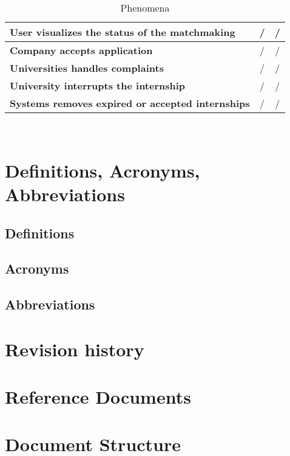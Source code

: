\begin{table}[H]
\begin{tabular}{|p{22em} | c | c |}
    \hline
    \textbf{User visualizes the status of the matchmaking} & /  & /\B\\
    \hline
    \textbf{Company accepts application} & / & /\B\\
    \hline
    \textbf{Universities handles complaints} & /  & /\B\\
    \hline
    \textbf{University interrupts the internship} & /  & /\B\\
    \hline
    \textbf{Systems removes expired or accepted internships} & /  & /\B\\
    \hline
    \end{tabular}
    \\[10pt]
    \caption{Phenomena}
    \label{table:example}
\end{table}


\section{Definitions, Acronyms, Abbreviations}

\subsection{Definitions}

\subsection{Acronyms}

\subsection{Abbreviations}

\section{Revision history}

\section{Reference Documents}

\section{Document Structure}